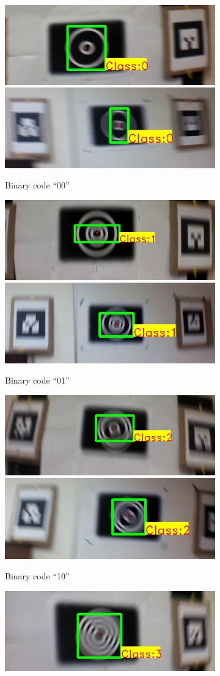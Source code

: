 \documentclass[10pt,twocolumn,letterpaper]{article}
\begin{document}
\begin{figure}[hb!]
\begin{subfigure}{\linewidth}
\centering
  \includegraphics[width=0.4\linewidth]{output_00.jpg}
  \includegraphics[width=0.4\linewidth]{new_results/output_00.jpg}
  \caption{Binary code ``00''}
  \label{fig:output0}
\end{subfigure}
\begin{subfigure}{\linewidth}
\centering
  \includegraphics[width=0.4\linewidth]{output_01.jpg}
  \includegraphics[width=0.4\linewidth]{new_results/output_01.jpg}
  \caption{Binary code ``01''}
  \label{fig:output1}
\end{subfigure}
\begin{subfigure}{\linewidth}
\centering
  \includegraphics[width=0.4\linewidth]{output_10.jpg}
  \includegraphics[width=0.4\linewidth]{new_results/output_10.jpg}
  \caption{Binary code ``10''}
  \label{fig:output2}
\end{subfigure}
\begin{subfigure}{\linewidth}
\centering
  \includegraphics[width=0.4\linewidth]{output_11.jpg}

\end{subfigure}
\end{figure}
\end{document}

